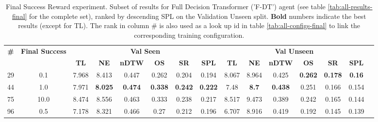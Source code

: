 \begin{table}
\centering
\caption{\label{tab:f_dt_reward_scale}Final Success Reward experiment. Subset of results for Full Decision Transformer ('F-DT') agent (see table \ref{tab:all-results-final} for the complete set), ranked by descending SPL on the Validation Unseen split. \textbf{Bold} numbers indicate the best results (except for TL). The rank in column \# is also used as a look up id in table \ref{tab:all-configs-final} to link the corresponding training configuration.}
\begin{tabular}{@{\hskip3pt}c@{\hskip3pt}c@{\hskip3pt}c@{\hskip3pt}c@{\hskip3pt}c@{\hskip3pt}c@{\hskip3pt}c@{\hskip3pt}c@{\hskip3pt}c@{\hskip3pt}c@{\hskip3pt}c@{\hskip3pt}c@{\hskip3pt}c@{\hskip3pt}c@{\hskip3pt}c}
\toprule
                                  \textbf{\#} & \textbf{Final Success} & \multicolumn{6}{c}{\textbf{Val Seen}} & \multicolumn{6}{c}{\textbf{Val Unseen}} \\
\cmidrule(l){3-8}\cmidrule(l){9-14}\textbf{~} &             \textbf{~} &       \textbf{TL} &     \textbf{NE} &   \textbf{nDTW} &     \textbf{OS} &     \textbf{SR} &    \textbf{SPL} &         \textbf{TL} &   \textbf{NE} &   \textbf{nDTW} &     \textbf{OS} &     \textbf{SR} &   \textbf{SPL} \\
\midrule
                                           29 &                    0.1 &             7.968 &           8.413 &           0.447 &           0.262 &           0.204 &           0.194 &               8.067 &         8.964 &           0.425 &  \textbf{0.262} &  \textbf{0.178} &  \textbf{0.16} \\
                                           44 &                    1.0 &             7.971 &  \textbf{8.025} &  \textbf{0.474} &  \textbf{0.338} &  \textbf{0.242} &  \textbf{0.222} &                7.48 &  \textbf{8.7} &  \textbf{0.438} &           0.251 &           0.166 &          0.154 \\
                                           75 &                   10.0 &             8.474 &           8.556 &           0.463 &           0.333 &           0.238 &           0.217 &               8.517 &         9.473 &           0.389 &           0.242 &           0.165 &          0.144 \\
                                           96 &                    0.5 &             7.178 &           8.321 &           0.466 &            0.27 &           0.212 &           0.196 &               6.707 &         8.916 &           0.419 &           0.192 &           0.145 &          0.139 \\
\bottomrule
\end{tabular}
\end{table}
